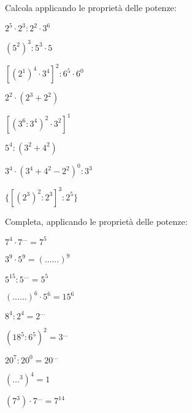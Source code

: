 \begin{esercizio}
Calcola applicando le proprietà delle potenze:
 \begin{htmulticols}{2}
 \begin{enumeratees}
 \item \(2^5\cdot2^3:2^2\cdot3^6\) 
 \item \((5^2)^3:5^3\cdot5\) 
 \item \([(2^1)^4\cdot 3^4]^2:6^5\cdot6^0\) 
% 
% 
 \item \(2^2\cdot(2^3+2^2)\) 
 \item \([(3^6:3^4)^2\cdot3^2]^1\) 
 \item \(5^4 : (3^2+4^2)\) 
 \item \(3^4\cdot(3^4+4^2-2^2)^0:3^3\) 
 \item \(\{[(2^3)^2:2^3]^3:2^5\}\) 
 \end{enumeratees}
 \end{htmulticols}
\end{esercizio}

\begin{esercizio}
 Completa, applicando le proprietà delle potenze:
\begin{htmulticols}{3}
 \begin{enumeratees}
 \item \(7^4\cdot7^{\ldots}=7^5\)
 \item \(3^9\cdot5^9=(\ldots\ldots)^9\)
 \item \(5^{15}:5^{\ldots}=5^5\)
 \item \((\ldots\ldots)^6\cdot5^6=15^6\)
 \item \(8^4:2^4=2^{\ldots}\)
 \item \((18^5:6^5)^2=3^{\ldots}\)
 \item \(20^7:20^0=20^{\ldots}\)
 \item \((\ldots^3)^4=1\)
 \item \((7^3) \cdot 7^{\ldots}=7^{14}\)
 \end{enumeratees}
\end{htmulticols}
\end{esercizio}

